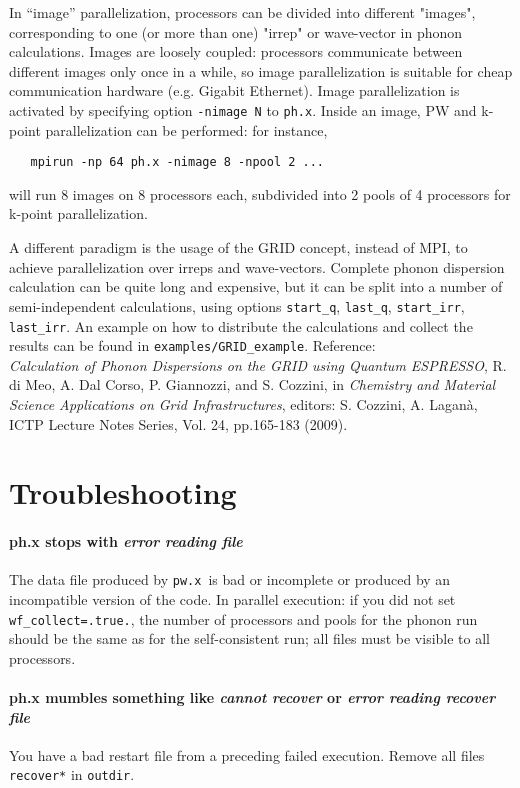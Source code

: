 \documentclass[12pt,a4paper]{article}
\def\pwx{\texttt{pw.x}}
\def\phx{\texttt{ph.x}}
\begin{document}
In  ``image'' parallelization, processors can be divided into different 
"images", corresponding to one (or more than one) "irrep" or wave-vector 
in phonon calculations. Images are loosely coupled: processors communicate
between different images only once in a while, so image parallelization
is suitable for cheap communication hardware (e.g. Gigabit Ethernet).
Image parallelization is activated by specifying option 
\texttt{-nimage N} to \phx. Inside an image, PW and k-point parallelization
can be performed: for instance,
\begin{verbatim}
   mpirun -np 64 ph.x -nimage 8 -npool 2 ...
\end{verbatim}
will run 8 images on 8 processors each, subdivided into 2 pools of 4
processors for k-point parallelization.

A different paradigm is the usage of the GRID concept, instead of MPI,
to achieve parallelization over irreps and wave-vectors.
Complete phonon dispersion calculation can be quite long and
expensive, but it can be split into a number of semi-independent
calculations, using options \texttt{start\_q}, \texttt{last\_q},
\texttt{start\_irr}, \texttt{last\_irr}. An example on how to
distribute the calculations and collect the results can be found
in \texttt{examples/GRID\_example}. Reference:\\
{\it Calculation of Phonon Dispersions on the GRID using Quantum
     ESPRESSO},
     R. di Meo, A. Dal Corso, P. Giannozzi, and S. Cozzini, in
     {\it Chemistry and Material Science Applications on Grid Infrastructures},
     editors: S. Cozzini, A. Lagan\`a, ICTP Lecture Notes Series,
     Vol. 24, pp.165-183 (2009).


\section{Troubleshooting}

\paragraph{ph.x stops with {\em error reading file}}
The data file produced by \pwx\ is bad or incomplete or produced
by an incompatible version of the code.
In parallel execution: if you did not set \texttt{wf\_collect=.true.}, the number
of processors and pools for the phonon run should be the same as for the
self-consistent run; all files must be visible to all processors.

\paragraph{ph.x mumbles something like {\em cannot recover} or {\em error
  reading recover file}} 
You have a bad restart file from a preceding failed execution.
Remove all files \texttt{recover*} in \texttt{outdir}.
\end{document}
